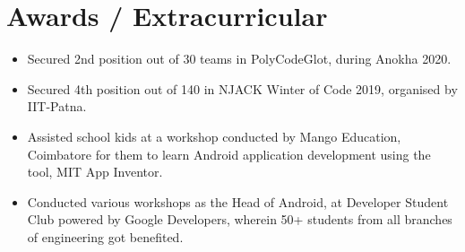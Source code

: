 \documentclass[letterpaper,11pt]{article}
\newcommand{\resumeItem}[1]{
  \item\small{
    {#1 \vspace{-2pt}}
  }
}
\newcommand{\resumeItemListStart}{\begin{itemize}}
\newcommand{\resumeItemListEnd}{\end{itemize}\vspace{-5pt}}
\begin{document}
\section{Awards / Extracurricular}
            \resumeItemListStart
                \resumeItem{Secured 2nd position out of 30 teams in PolyCodeGlot, during Anokha 2020.}\vspace{-5pt}
                \resumeItem{Secured 4th position out of 140 in NJACK Winter of Code 2019, organised by IIT-Patna.}\vspace{-5pt}
                \resumeItem{Assisted school kids at a workshop conducted by Mango Education, Coimbatore for them to learn Android application development using the tool,  MIT App Inventor.}\vspace{-5pt}
                \resumeItem{Conducted various workshops as the Head of Android, at Developer Student Club powered by Google Developers,  wherein 50+ students from all branches of engineering got benefited.}\vspace{-5pt}
            \resumeItemListEnd
\end{document}
